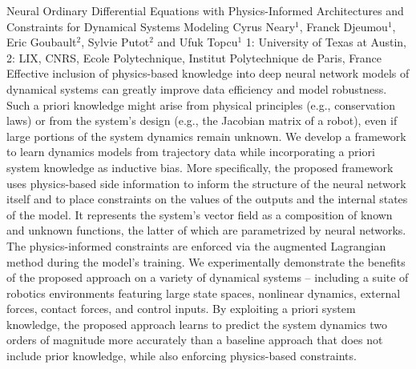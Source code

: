 \vspace{1.5ex}
\abs
{Neural Ordinary Differential Equations with Physics-Informed Architectures and Constraints for Dynamical Systems Modeling}
{Cyrus Neary$^1$, Franck Djeumou$^1$, Eric Goubault$^2$, Sylvie Putot$^2$ and Ufuk Topcu$^1$}
{1: University of Texas at Austin, 2: LIX, CNRS, Ecole Polytechnique, Institut Polytechnique de Paris, France}
{Effective inclusion of physics-based knowledge into deep neural network models of dynamical systems can greatly improve data efficiency and model robustness. Such a priori knowledge might arise from physical principles (e.g., conservation laws) or from the system's design (e.g., the Jacobian matrix of a robot), even if large portions of the system dynamics remain unknown. We develop a framework to learn dynamics models from trajectory data while incorporating a priori system knowledge as inductive bias. More specifically, the proposed framework uses physics-based side information to inform the structure of the neural network itself and to place constraints on the values of the outputs and the internal states of the model. It represents the system's vector field as a composition of known and unknown functions, the latter of which are parametrized by neural networks. The physics-informed constraints are enforced via the augmented Lagrangian method during the model's training. We experimentally demonstrate the benefits of the proposed approach on a variety of dynamical systems -- including a suite of robotics environments featuring large state spaces, nonlinear dynamics, external forces, contact forces, and control inputs. By exploiting a priori system knowledge, the proposed approach learns to predict the system dynamics two orders of magnitude more accurately than a baseline approach that does not include prior knowledge, while also enforcing physics-based constraints.}


